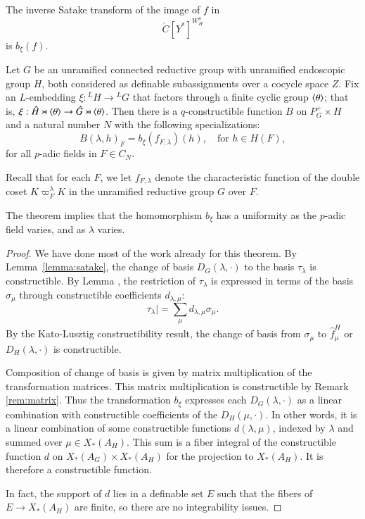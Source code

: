 The inverse Satake transform of the image of $f$ in
\[
\ring{C}[Y^*]^{W_H^\theta}
\]
is $b_\xi(f)$.

\begin{theorem}\label{thm:B}
Let $G$ be an unramified connected reductive group with unramified endoscopic group $H$, both considered as definable
subassignments over a cocycle space $Z$.  Fix an $L$-embedding $\xi:{}^LH\to {}^LG$ that factors through a finite
cyclic group $\langle{\theta}\rangle$; that is, $\xi:\hat H\rtimes \langle{\theta}\rangle \to \hat G \rtimes \langle{\theta}\rangle$.
Then
there is a $q$-constructible function $B$ on $P^+_G\times H$ and a natural number $N$ with the following specializations:
\[
B(\lambda,h)_F = b_\xi(f_{F,\lambda})(h),\quad \text{for } h\in H(F),
\]
for all $p$-adic fields in $F\in C_N$.  
\end{theorem}

Recall that for each $F$, we let  $f_{F,\lambda}$ denote the characteristic function
of the double coset $K\varpi_F^\lambda K$ in the unramified reductive group $G$ over $F$.

The theorem implies that the homomorphism $b_\xi$ has a uniformity as the $p$-adic field
varies, and as $\lambda$ varies.  

\begin{proof}
We have done most of the work already for this theorem.
By Lemma~\ref{lemma:satake}, the change of basis $D_G(\lambda,\cdot)$ to the basis $\tau_\lambda$
is constructible.  
By Lemma , 
the restriction of $\tau_\lambda$ is expressed in terms of the basis $\sigma_\mu$ through
constructible coefficients $d_{\lambda,\mu}$:
\[
\tau_\lambda| = \sum_{\mu} d_{\lambda,\mu} \sigma_\mu.
\]
By the Kato-Lusztig constructibility result, the change of basis from 
$\sigma_\mu$ to $\hat f^H_\mu$ or $D_H(\lambda,\cdot)$ is constructible.  

Composition of change of basis is given by matrix multiplication of the transformation matrices.
This matrix multiplication is constructible by Remark \ref{rem:matrix}.  Thus the transformation $b_\xi$
expresses each $D_G(\lambda,\cdot)$ as a linear combination with constructible coefficients
of the $D_H(\mu,\cdot)$.   In other words, it is a linear combination of some constructible functions
$d(\lambda,\mu)$, indexed by $\lambda$ and summed over $\mu\in X_*(A_H)$.  This sum
is a fiber integral of the constructible function $d$ on $X_*(A_G)\times X_*(A_H)$ for the
projection to $X_*(A_H)$.  It is therefore a constructible function.

In fact, the support of $d$ lies in a definable set $E$ such that the fibers of $E\to X_*(A_H)$
are finite, so there are no integrability issues.
\end{proof}

